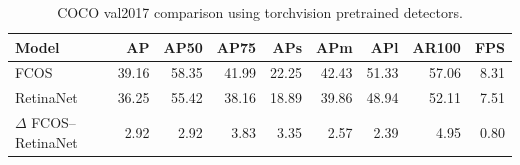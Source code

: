 \begin{table}[t]
\centering
\caption{COCO val2017 comparison using torchvision pretrained detectors.}
\label{tab:main-coco-metrics}
\begin{tabular}{lrrrrrrrr}
\toprule
Model & AP & AP50 & AP75 & APs & APm & APl & AR100 & FPS \\
\midrule
FCOS & 39.16 & 58.35 & 41.99 & 22.25 & 42.43 & 51.33 & 57.06 & 8.31 \\
RetinaNet & 36.25 & 55.42 & 38.16 & 18.89 & 39.86 & 48.94 & 52.11 & 7.51 \\
$\Delta$ FCOS--RetinaNet & 2.92 & 2.92 & 3.83 & 3.35 & 2.57 & 2.39 & 4.95 & 0.80 \\
\bottomrule
\end{tabular}
\end{table}
